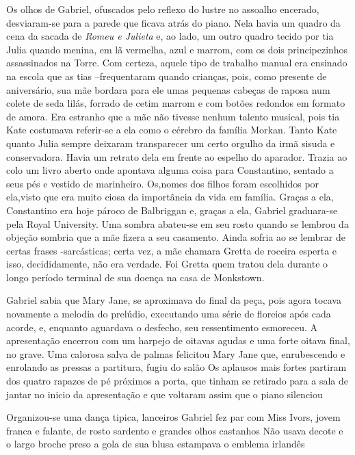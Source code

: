 Os olhos de Gabriel, ofuscados pelo reflexo do lustre no assoalho
encerado, desviaram-se para a parede que ficava atrás do piano. Nela
havia um quadro da cena da sacada de \textit{Romeu e Julieta} e, ao lado, um
outro quadro tecido por tia Julia quando menina, em lã vermelha, azul
e marrom, com os dois principezinhos assassinados na Torre. Com
certeza, aquele tipo de trabalho manual era ensinado na escola que
as tias --frequentaram quando crianças, pois, como presente de
aniversário, sua mãe bordara para ele umas pequenas cabeças de raposa
num colete de seda lilás, forrado de cetim marrom e com botões redondos em formato de
amora. Era estranho que a mãe não tivesse nenhum talento musical, pois
tia Kate costumava referir-se a ela como o cérebro
da família Morkan. Tanto Kate quanto Julia sempre deixaram
transparecer um certo orgulho da irmã sisuda e conservadora. Havia um
retrato dela em frente ao espelho do aparador. Trazia ao colo um
livro aberto onde apontava alguma coisa para Constantino, sentado a
seus pés e vestido de marinheiro. Os,nomes dos filhos foram escolhidos
por ela,visto que era muito ciosa da importância da vida em família.
Graças a ela, Constantino era hoje pároco de Balbriggan e, graças a
ela, Gabriel graduara-se pela Royal University. Uma sombra abateu-se
em seu rosto quando se lembrou da objeção sombria que a mãe fizera a
seu casamento. Ainda sofria ao se lembrar de certas frases
-sarcásticas; certa vez, a mãe chamara Gretta de roceira esperta e
isso, decididamente, não era verdade. Foi Gretta quem tratou dela
durante o longo período terminal de sua doença na casa de
Monkstown.

Gabriel sabia que Mary Jane, se aproximava do final da peça, pois
agora tocava novamente a melodia do prelúdio, executando uma série de
floreios após cada acorde, e, enquanto aguardava o desfecho, seu
ressentimento esmoreceu. A apresentação encerrou com um harpejo de
oitavas agudas e uma forte oitava final, no grave. Uma calorosa salva
de palmas felicitou Mary Jane que, enrubescendo e enrolando as pressas
a partitura, fugiu do salão Os aplausos mais fortes partiram dos
quatro rapazes de pé próximos a porta, que tinham se retirado para a
sala de jantar no inicio da apresentação e que voltaram assim que o
piano silenciou

Organizou-se uma dança tipica, lanceiros Gabriel fez par com Miss
Ivors, jovem franca e falante, de rosto sardento e grandes olhos
castanhos Não usava decote e o largo broche preso a gola de sua blusa
estampava o emblema irlandês

